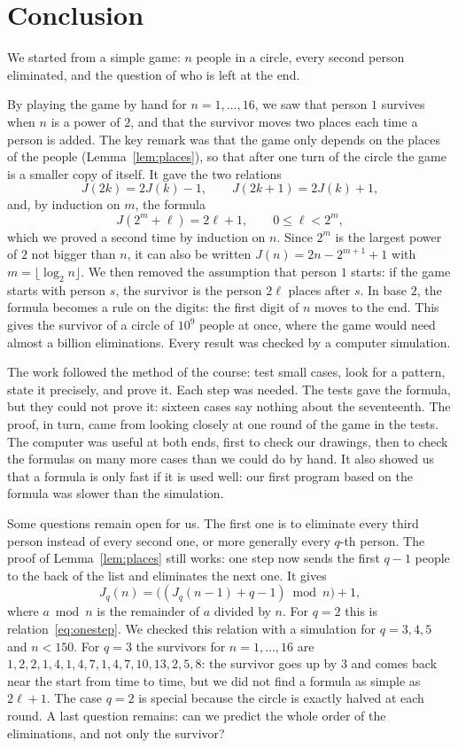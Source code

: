 \section{Conclusion}

We started from a simple game: $n$ people in a circle, every second person
eliminated, and the question of who is left at the end.

By playing the game by hand for $n=1,\dots,16$, we saw that person $1$ survives
when $n$ is a power of $2$, and that the survivor moves two places each time a
person is added. The key remark was that the game only depends on the places
of the people (Lemma~\ref{lem:places}), so that after one turn of the circle
the game is a smaller copy of itself. It gave the two relations
\[
J(2k)=2J(k)-1,\qquad J(2k+1)=2J(k)+1,
\]
and, by induction on $m$, the formula
\[
J(2^m+\ell)=2\ell+1,\qquad 0\leq\ell<2^m ,
\]
which we proved a second time by induction on $n$. Since $2^m$ is the largest
power of $2$ not bigger than $n$, it can also be written
$J(n)=2n-2^{m+1}+1$ with $m=\lfloor\log_2 n\rfloor$.
We then removed the assumption that person $1$ starts: if the game starts with
person $s$, the survivor is the person $2\ell$ places after $s$. In base $2$,
the formula becomes a rule on the digits: the first digit of $n$ moves to the
end. This gives the survivor of a circle of $10^9$ people at once, where the
game would need almost a billion eliminations. Every result was checked by a
computer simulation.

The work followed the method of the course: test small cases, look for a
pattern, state it precisely, and prove it. Each step was needed. The tests
gave the formula, but they could not prove it: sixteen cases say nothing about
the seventeenth. The proof, in turn, came from looking closely at one round of
the game in the tests. The computer was useful at both ends, first to check
our drawings, then to check the formulas on many more cases than we could do
by hand. It also showed us that a formula is only fast if it is used well:
our first program based on the formula was slower than the simulation.

Some questions remain open for us. The first one is to eliminate every third
person instead of every second one, or more generally every $q$-th person. The
proof of Lemma~\ref{lem:places} still works: one step now sends the first
$q-1$ people to the back of the list and eliminates the next one. It gives
\[
J_q(n)=\big((J_q(n-1)+q-1)\bmod n\big)+1,
\]
where $a\bmod n$ is the remainder of $a$ divided by $n$. For $q=2$ this is
relation~\eqref{eq:onestep}. We checked this relation with a simulation for
$q=3,4,5$ and $n<150$. For $q=3$ the survivors for $n=1,\dots,16$ are
$1,2,2,1,4,1,4,7,1,4,7,10,13,2,5,8$: the survivor goes up by $3$ and comes
back near the start from time to time, but we did not find a formula as
simple as $2\ell+1$. The case $q=2$ is special because the circle is exactly
halved at each round. A last question remains: can we predict the whole
order of the eliminations, and not only the survivor?
